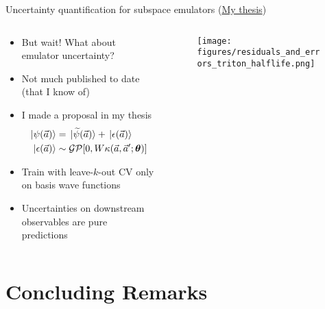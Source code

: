\documentclass[xcolor=dvipsnames, aspectratio=169]{beamer}
\begin{document}
\begin{frame}{Uncertainty quantification for subspace emulators (\alert{\href{http://rave.ohiolink.edu/etdc/view?acc_num=osu1587114253866152}{My thesis}})}

\begin{columns}[t]
\begin{column}{0.5\textwidth}
\begin{itemize}
\item But wait! What about emulator uncertainty?
\item Not much published to date (that I know of)
\item I made a proposal in my thesis
\begin{align*}
    \ket*{\psi(\vec{a})} & = \ket*{\widetilde{\psi}(\vec{a})} + \ket*{\epsilon(\vec{a})} \\
    \ket*{\epsilon(\vec{a})} & \sim \mathcal{GP}[0, W \kappa(\vec{a}, \vec{a}'; \boldsymbol{\theta})]
\end{align*}
\item Train with leave-$k$-out CV only on basis wave functions
\item Uncertainties on downstream observables are pure predictions
\end{itemize}
\end{column}
\begin{column}{0.5\textwidth}
\begin{figure}
\texttt{[image: figures/residuals\_and\_errors\_triton\_halflife.png]}
\end{figure}
\end{column}
\end{columns}
\end{frame}


\section{Concluding Remarks}
\end{document}

